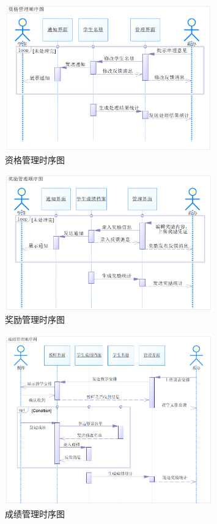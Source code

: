 \documentclass[12pt, a4paper, oneside]{ctexart}
\begin{document}
\begin{figure}[H]
    \centering
    \includegraphics[width = 0.8\textwidth]{../pic/3/3.6.png}
    \caption{资格管理时序图}
\end{figure}

\begin{figure}[H]
    \centering
    \includegraphics[width = 0.8\textwidth]{../pic/3/3.7.png}
    \caption{奖励管理时序图}
\end{figure}

\begin{figure}[H]
    \centering
    \includegraphics[width = 0.8\textwidth]{../pic/3/3.8.png}
    \caption{成绩管理时序图}
\end{figure}
\end{document}
